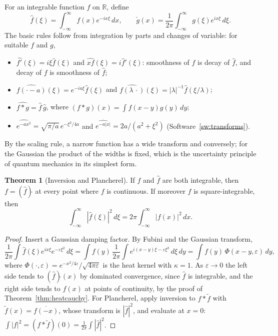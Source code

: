 \documentclass[11pt,a4paper]{article}
\numberwithin{equation}{section}
\theoremstyle{definition}
\newtheorem{thm}{Theorem}[subsection]
\begin{document}
For an integrable function $f$ on $\mathbb R$, define
\[
\hat f(\xi) = \int_{-\infty}^\infty f(x)e^{-ix\xi}\,dx, \qquad \check g(x) = \frac1{2\pi}\int_{-\infty}^\infty g(\xi)e^{ix\xi}\,d\xi .
\]
The basic rules follow from integration by parts and changes of variable: for suitable $f$ and $g$,
\begin{itemize}
\item $\widehat{f'}(\xi) = i\xi\hat f(\xi)$ and $\widehat{xf}(\xi) = i\hat f'(\xi)$: smoothness of $f$ is decay of $\hat f$, and decay of $f$ is smoothness of $\hat f$;
\item $\widehat{f(\cdot - a)}(\xi) = e^{-ia\xi}\hat f(\xi)$ and $\widehat{f(\lambda\,\cdot)}(\xi) = |\lambda|^{-1}\hat f(\xi/\lambda)$;
\item $\widehat{f * g} = \hat f\,\hat g$, where $(f * g)(x) = \int f(x - y)g(y)\,dy$;
\item $\widehat{e^{-ax^2}} = \sqrt{\pi/a}\,e^{-\xi^2/4a}$ and $\widehat{e^{-a|x|}} = 2a/(a^2 + \xi^2)$ (Software~\ref{sw:transforms}).
\end{itemize}
By the scaling rule, a narrow function has a wide transform and conversely; for the Gaussian the product of the widths is fixed, which is the uncertainty principle of quantum mechanics in its simplest form.

\begin{thm}[Inversion and Plancherel]
\label{thm:inversion}
If $f$ and $\hat f$ are both integrable, then $f = (\hat f)\check{}$ at every point where $f$ is continuous. If moreover $f$ is square-integrable, then
\[
\int_{-\infty}^\infty|\hat f(\xi)|^2\,d\xi = 2\pi\int_{-\infty}^\infty|f(x)|^2\,dx .
\]
\end{thm}

\begin{proof}
Insert a Gaussian damping factor. By Fubini and the Gaussian transform,
\[
\frac1{2\pi}\int\hat f(\xi)e^{ix\xi}e^{-\varepsilon\xi^2}\,d\xi = \int f(y)\,\frac1{2\pi}\int e^{i(x - y)\xi - \varepsilon\xi^2}\,d\xi\,dy = \int f(y)\,\Phi(x - y, \varepsilon)\,dy ,
\]
where $\Phi(\cdot, \varepsilon) = e^{-x^2/4\varepsilon}/\sqrt{4\pi\varepsilon}$ is the heat kernel with $\kappa = 1$. As $\varepsilon \to 0$ the left side tends to $(\hat f)\check{}(x)$ by dominated convergence, since $\hat f$ is integrable, and the right side tends to $f(x)$ at points of continuity, by the
proof of Theorem~\ref{thm:heatcauchy}. For Plancherel, apply inversion to $f * \tilde f$ with $\tilde f(x) = \overline{f(-x)}$, whose transform is $|\hat f|^2$, and evaluate at $x = 0$: $\int|f|^2 = (f * \tilde f)(0) = \frac1{2\pi}\int|\hat f|^2$.
\end{proof}
\end{document}

